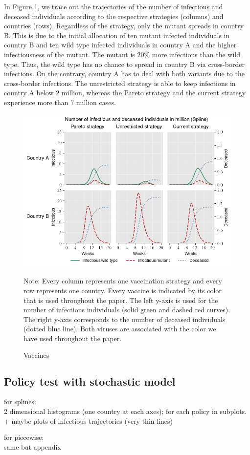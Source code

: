 In Figure \ref{fig:results_splines_infectious_dead}, we trace out the trajectories of the number of infectious and deceased individuals according to the respective strategies (columns) and countries (rows). Regardless of the strategy, only the mutant spreads in country B. This is due to the initial allocation of ten mutant infected individuals in country B and ten wild type infected individuals in country A and the higher infectiousness of the mutant. The mutant is 20\% more infectious than the wild type. Thus, the wild type has no chance to spread in country B via cross-border infections. On the contrary, country A has to deal with both variants due to the cross-border infections. The unrestricted strategy is able to keep infections in country A below 2 million, whereas the Pareto strategy and the current strategy experience more than 7 million cases. 


\begin{figure}[h!]
\centering
\includegraphics[scale=0.85]{images/splines_infectious_dead.png}\\
\begin{flushleft}
\scriptsize{Note:} Every column represents one vaccination strategy and every row represents one country. Every vaccine is indicated by its color that is used throughout the paper. The left y-axis is used for the number of infectious individuals (solid green and dashed red curves). The right y-axis corresponds to the number of deceased individuals (dotted blue line). Both viruses are associated with the color we have used throughout the paper. 
\end{flushleft}
\caption{Vaccines}
\label{fig:results_splines_infectious_dead}
\end{figure}



\clearpage
\subsection{Policy test with stochastic model}
for splines:\\
2 dimensional histograms (one country at each axes); for each policy in subplots.\\
+ maybe plots of infectious trajectories (very thin lines)



for piecewise:\\
same but appendix









